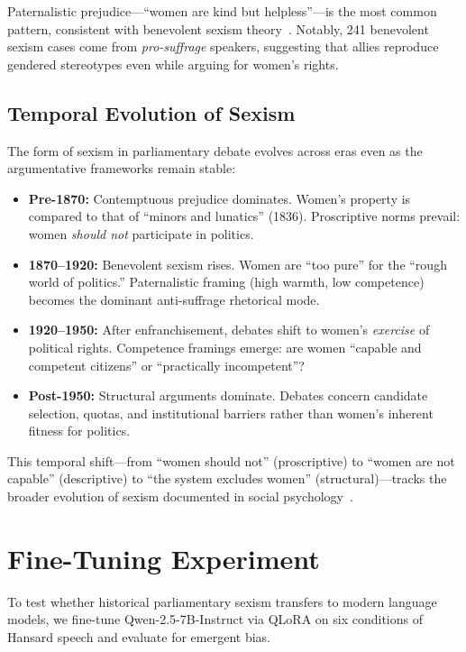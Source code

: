 \documentclass[11pt]{article}
\begin{document}
Paternalistic prejudice---``women are kind but helpless''---is the most common pattern, consistent with benevolent sexism theory~\cite{glick1996}.
Notably, 241 benevolent sexism cases come from \emph{pro-suffrage} speakers, suggesting that allies reproduce gendered stereotypes even while arguing for women's rights.

\subsection{Temporal Evolution of Sexism}


The form of sexism in parliamentary debate evolves across eras even as the argumentative frameworks remain stable:

\begin{itemize}
\item \textbf{Pre-1870:} Contemptuous prejudice dominates. Women's property is compared to that of ``minors and lunatics'' (1836). Proscriptive norms prevail: women \emph{should not} participate in politics.
\item \textbf{1870--1920:} Benevolent sexism rises. Women are ``too pure'' for the ``rough world of politics.'' Paternalistic framing (high warmth, low competence) becomes the dominant anti-suffrage rhetorical mode.
\item \textbf{1920--1950:} After enfranchisement, debates shift to women's \emph{exercise} of political rights. Competence framings emerge: are women ``capable and competent citizens'' or ``practically incompetent''?
\item \textbf{Post-1950:} Structural arguments dominate. Debates concern candidate selection, quotas, and institutional barriers rather than women's inherent fitness for politics.
\end{itemize}

This temporal shift---from ``women should not'' (proscriptive) to ``women are not capable'' (descriptive) to ``the system excludes women'' (structural)---tracks the broader evolution of sexism documented in social psychology~\cite{glick1996, fiske2002}.

\section{Fine-Tuning Experiment}

To test whether historical parliamentary sexism transfers to modern language models, we fine-tune Qwen-2.5-7B-Instruct via QLoRA on six conditions of Hansard speech and evaluate for emergent bias.
\end{document}

